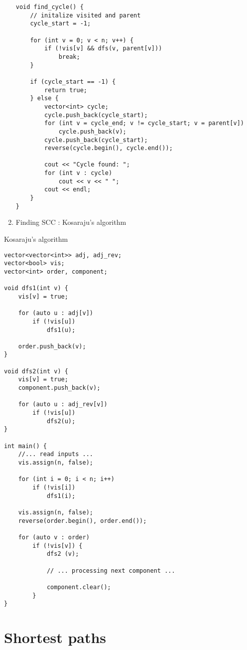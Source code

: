 \documentclass[titlepage, 12pt]{book}
\begin{document}
\begin{enumerate}
\begin{verbatim}
void find_cycle() {
    // initalize visited and parent
    cycle_start = -1;
                
    for (int v = 0; v < n; v++) {
        if (!vis[v] && dfs(v, parent[v]))
            break;
    }           
                
    if (cycle_start == -1) {
        return true;
    } else {    
        vector<int> cycle;
        cycle.push_back(cycle_start);
        for (int v = cycle_end; v != cycle_start; v = parent[v])
            cycle.push_back(v);
        cycle.push_back(cycle_start);
        reverse(cycle.begin(), cycle.end());
 
        cout << "Cycle found: ";
        for (int v : cycle)
            cout << v << " ";
        cout << endl;
    }           
}               
\end{verbatim}
    \item Finding SCC : Kosaraju's algorithm
\end{enumerate}

\begin{algorithm}{Kosaraju's algorithm}{}
\begin{verbatim}
vector<vector<int>> adj, adj_rev;
vector<bool> vis;
vector<int> order, component;

void dfs1(int v) {
    vis[v] = true;

    for (auto u : adj[v])
        if (!vis[u])
            dfs1(u);

    order.push_back(v);
}

void dfs2(int v) {
    vis[v] = true;
    component.push_back(v);

    for (auto u : adj_rev[v])
        if (!vis[u])
            dfs2(u);
}
 
int main() {
    //... read inputs ...
    vis.assign(n, false);

    for (int i = 0; i < n; i++)
        if (!vis[i])
            dfs1(i);

    vis.assign(n, false);
    reverse(order.begin(), order.end());

    for (auto v : order)
        if (!vis[v]) {
            dfs2 (v);

            // ... processing next component ...

            component.clear();
        }
}
\end{verbatim}
\end{algorithm}

\section{Shortest paths}
\end{document}

